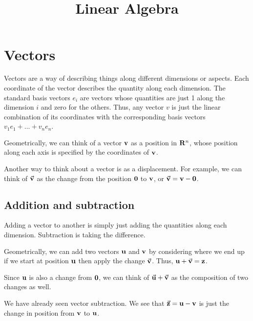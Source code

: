\documentclass[../main.tex]{subfiles}
\title{Linear Algebra}
\author{}
\date{}
\begin{document}
\maketitle
\tableofcontents

\newpage

\section{Vectors}

Vectors are a way of describing things along different dimensions or aspects.
Each coordinate of the vector describes the quantity along each dimension.
The standard basis vectors \( e_i \)
are vectors whose quantities are just 1 along the dimension \( i \)
and zero for the others.
Thus,
any vector \( v \) is just the linear combination of its coordinates
with the corresponding basis vectors
\( v_1 e_1 + \dots + v_n e_n \).

Geometrically, we can think of a vector \( \vb{v} \) as a position in \( \mathbf R^n \),
whose position along each axis is specified by the coordinates of \( \vb{v} \).

Another way to think about a vector is as a displacement.
For example,
we can think of \( \va{v} \) as the change from the position \( \vb{0} \) to \( \vb{v} \),
or \( \va{v} = \vb{v} - \vb{0} \).

\noindent


\subsection{Addition and subtraction}

Adding a vector to another is simply just adding the quantities along each dimension.
Subtraction is taking the difference.

Geometrically, we can add two vectors \( \vb{u} \) and \( \vb{v} \)
by considering where we end up if we start at position \( \vb{u} \)
then apply the change \( \va{v} \).
Thus, \( \vb{u} + \va{v} = \vb{z} \).

\noindent


Since \( \vb{u} \) is also a change from \( \vb{0} \),
we can think of \( \va u + \va v \) as the composition of two changes as well.

We have already seen vector subtraction.
We see that \( \va{z} = \vb{u} - \vb{v} \)
is just the change in position from \( \vb{v} \) to \( \vb{u} \).

\noindent

\end{document}
